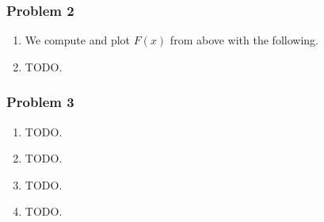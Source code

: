 \documentclass[letter,11pt]{article}
\begin{document}
\subsubsection*{Problem 2}
\begin{enumerate}[label=\alph*.]
  \item We compute and plot $F(x)$ from above with the following.

  

  \item TODO.
\end{enumerate}

\subsubsection*{Problem 3}
\begin{enumerate}[label=\alph*.]
  \item TODO.
  \item TODO.
  \item TODO.
  \item TODO.
\end{enumerate}
\end{document}
